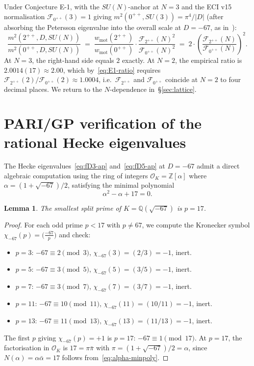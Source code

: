 \documentclass[11pt,a4paper]{amsart}
\providecommand{\OK}{\mathcal{O}_K}
\providecommand{\Z}{\mathbb{Z}}
\providecommand{\Q}{\mathbb{Q}}
\newtheorem{lemma}[theorem]{Lemma}
\theoremstyle{definition}
\begin{document}
Under Conjecture E-1, with the $SU(N)$-anchor at $N = 3$ and the ECI v15
normalisation $\mathcal{F}_{0^{++}}(3) = 1$ giving $m^{2}(0^{++}, SU(3)) = \pi^{4}/|D|$
(after absorbing the Petersson eigenvalue into the overall scale at $D = -67$,
as in~\cite[\S6.4]{ThmC6FN}):
\begin{equation}\label{eq:E1-ratio}
\frac{m^{2}(2^{++}, D, SU(N))}{m^{2}(0^{++}, D, SU(N))} \;=\;
\frac{w_{\mathrm{mot}}(2^{++})}{w_{\mathrm{mot}}(0^{++})} \cdot
\frac{\mathcal{F}_{2^{++}}(N)^{2}}{\mathcal{F}_{0^{++}}(N)^{2}}
\;=\; 2 \cdot \left(\frac{\mathcal{F}_{2^{++}}(N)}{\mathcal{F}_{0^{++}}(N)}\right)^{2}.
\end{equation}
At $N = 3$, the right-hand side equals $2$ exactly. At $N = 2$, the empirical
ratio is $2.0014(17) \approx 2.00$, which by~\eqref{eq:E1-ratio} requires
$\mathcal{F}_{2^{++}}(2) / \mathcal{F}_{0^{++}}(2) \approx 1.0004$, i.e.\
$\mathcal{F}_{2^{++}}$ and $\mathcal{F}_{0^{++}}$ coincide at $N = 2$ to four
decimal places. We return to the $N$-dependence in~\S\ref{sec:lattice}.

\section{PARI/GP verification of the rational Hecke eigenvalues}\label{sec:PARI}

The Hecke eigenvalues~\eqref{eq:fD3-ap} and~\eqref{eq:fD5-ap} at $D = -67$
admit a direct algebraic computation using the ring of integers
$\OK = \Z[\alpha]$ where $\alpha = (1 + \sqrt{-67})/2$, satisfying the
minimal polynomial
\begin{equation}\label{eq:alpha-minpoly}
\alpha^{2} - \alpha + 17 = 0.
\end{equation}

\begin{lemma}\label{lem:p17}
The smallest split prime of $K = \Q(\sqrt{-67})$ is $p = 17$.
\end{lemma}

\begin{proof}
For each odd prime $p < 17$ with $p \neq 67$, we compute the Kronecker
symbol $\chi_{-67}(p) = \bigl(\frac{-67}{p}\bigr)$ and check:
\begin{itemize}\setlength\itemsep{2pt}
\item $p = 3$: $-67 \equiv 2 \pmod{3}$, $\chi_{-67}(3) = (2/3) = -1$, inert.
\item $p = 5$: $-67 \equiv 3 \pmod{5}$, $\chi_{-67}(5) = (3/5) = -1$, inert.
\item $p = 7$: $-67 \equiv 3 \pmod{7}$, $\chi_{-67}(7) = (3/7) = -1$, inert.
\item $p = 11$: $-67 \equiv 10 \pmod{11}$, $\chi_{-67}(11) = (10/11) = -1$, inert.
\item $p = 13$: $-67 \equiv 11 \pmod{13}$, $\chi_{-67}(13) = (11/13) = -1$, inert.
\end{itemize}
The first $p$ giving $\chi_{-67}(p) = +1$ is $p = 17$: $-67 \equiv 1 \pmod{17}$.
At $p = 17$, the factorisation in $\OK$ is $17 = \pi\bar\pi$ with
$\pi = (1 + \sqrt{-67})/2 = \alpha$, since $N(\alpha) = \alpha\bar\alpha = 17$
follows from~\eqref{eq:alpha-minpoly}.
\end{proof}
\end{document}
